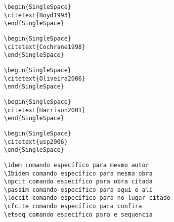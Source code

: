 \begin{alineas}
\begin{verbatim}
\begin{SingleSpace} 
\citetext{Boyd1993}
\end{SingleSpace}
\end{verbatim}


\begin{verbatim}
\begin{SingleSpace} 
\citetext{Cochrane1998}
\end{SingleSpace}
\end{verbatim}


\begin{verbatim}
\begin{SingleSpace} 
\citetext{Oliveira2006}
\end{SingleSpace}
\end{verbatim}


\begin{verbatim}
\begin{SingleSpace} 
\citetext{Harrison2001}
\end{SingleSpace}
\end{verbatim}


\begin{verbatim}
\begin{SingleSpace} 
\citetext{usp2006}
\end{SingleSpace}
\end{verbatim}


\quad

\item
\begin{verbatim}
\Idem comando específico para mesmo autor
\Ibidem comando específico para mesma obra
\opcit comando específico para obra citada
\passim comando específico para aqui e alí
\loccit comando específico para no lugar citado
\cfcite comando específico para confira
\etseq comando específico para e sequencia 
\end{verbatim} 


\end{alineas}
